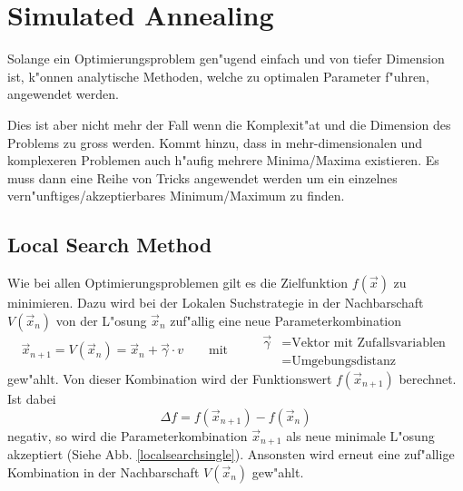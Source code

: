 %
%
%

\chapter{Simulated Annealing}

Solange ein Optimierungsproblem gen"ugend einfach und von tiefer
Dimension ist,
k"onnen analytische Methoden, welche zu optimalen Parameter f"uhren,
angewendet werden.

Dies ist aber nicht mehr der Fall wenn die Komplexit"at und die Dimension
des Problems zu gross werden.
Kommt hinzu, dass in mehr-dimensionalen und komplexeren Problemen auch
h"aufig mehrere Minima/Maxima existieren. Es muss dann eine Reihe von
Tricks angewendet werden um ein einzelnes vern"unftiges/akzeptierbares
Minimum/Maximum zu finden.
	
\section{Local Search Method}
Wie bei allen Optimierungsproblemen gilt es die Zielfunktion
$f(\vec{x})$ zu minimieren. Dazu wird bei der Lokalen Suchstrategie
in der Nachbarschaft $V(\vec{x}_n)$ von der L"osung $\vec{x}_n$
zuf"allig eine neue Parameterkombination
\[
\vec{x}_{n+1} =
V(\vec{x}_n) = \vec{x}_n + \vec{\gamma} \cdot v \qquad \text{mit }
\qquad
\begin{aligned}\vec{\gamma}&= \text{Vektor mit Zufallsvariablen}\\
& = \text{Umgebungsdistanz}\end{aligned}
\]
gew"ahlt. Von dieser Kombination
wird der Funktionswert $f(\vec{x}_{n+1})$ berechnet. Ist dabei
\[
\Delta f = f(\vec{x}_{n+1}) - f(\vec{x}_{n})
\]
negativ, so wird
die Parameterkombination $\vec{x}_{n+1}$ als neue minimale L"osung
akzeptiert (Siehe Abb. \ref{localsearchsingle}). Ansonsten wird erneut
eine zuf"allige Kombination in der Nachbarschaft $V(\vec{x}_n)$ gew"ahlt.

